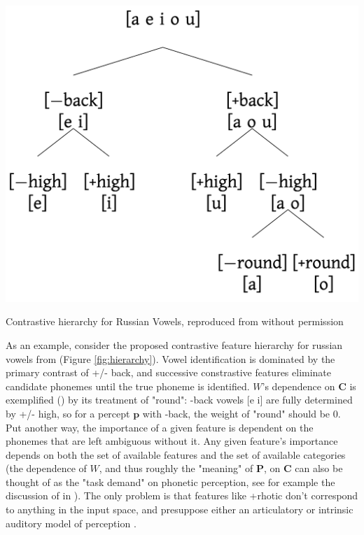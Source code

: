 \begin{marginfigure}
\includegraphics[]{modeling/figures/russian_vowel_hierarchy.png}
\caption{Contrastive hierarchy for Russian Vowels, reproduced from \citep{iosadVowelReductionRussian2012} without permission}
\label{fig:hierarchy}
\end{marginfigure}

As an example, consider the proposed contrastive feature hierarchy for russian vowels from \citep{iosadVowelReductionRussian2012} (Figure \ref{fig:hierarchy}). Vowel identification is dominated by the primary contrast of +/- back, and successive constrastive features eliminate candidate phonemes until the true phoneme is identified. $W$'s dependence on $\mathbf{C}$ is exemplified () by its treatment of "round": -back vowels [e i] are fully determined by +/- high, so for a percept $\mathbf{p}$ with -back, the weight of "round" should be 0. Put another way, the importance of a given feature is dependent on the phonemes that are left ambiguous without it. Any given feature's importance depends on both the set of available features and the set of available categories (the dependence of $W$, and thus roughly the "meaning" of $\mathbf{P}$, on $\mathbf{C}$ can also be thought of as the "task demand" on phonetic perception, see for example the discussion of \citep{leeExtendingALCOVEModel2002} in \citep{navarroDevilDeepBlue2019}). The only problem is that features like +rhotic don't correspond to anything in the input space, and presuppose either an articulatory or intrinsic auditory model of perception \citep{lindauStory1980}. 

